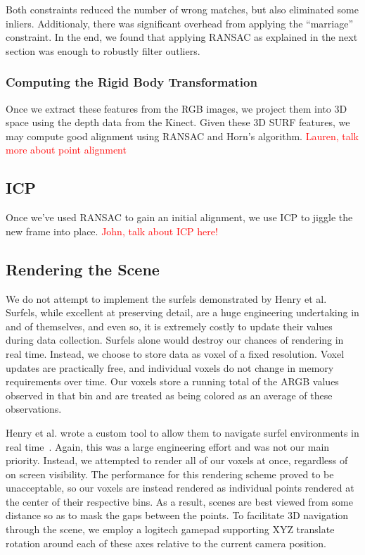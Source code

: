 \documentclass[letterpaper, 10pt, conference]{ieeeconf}
\newcommand{\xxx}[1]{\textcolor{red}{#1}}
\begin{document}
Both constraints reduced the number of wrong matches, but also eliminated some inliers.
Additionaly, there was significant overhead from applying the ``marriage'' constraint.
In the end, we found that applying RANSAC as explained in the next section was enough
to robustly filter outliers.

\subsubsection{Computing the Rigid Body Transformation}
\label{ransac}
Once we extract these features from the RGB images, we project them into 3D space
using the depth data from the Kinect. Given these 3D SURF features, we may
compute good alignment using RANSAC and Horn's algorithm. \xxx{Lauren, talk
    more about point alignment}

\subsection{ICP}
Once we've used RANSAC to gain an initial alignment, we use ICP to jiggle the
new frame into place. \xxx{John, talk about ICP here!}

\subsection{Rendering the Scene}
We do not attempt to implement the surfels demonstrated by Henry et al.
Surfels, while excellent at preserving detail, are a huge engineering
undertaking in and of themselves, and even so, it is extremely costly to
update their values during data collection. Surfels alone would destroy our
chances of rendering in real time. Instead, we choose to store data as voxel
of a fixed resolution. Voxel updates are practically free, and individual
voxels do not change in memory requirements over time. Our voxels store a
running total of the ARGB values observed in that bin and are treated as
being colored as an average of these observations.

Henry et al. wrote a custom tool to allow them to navigate surfel environments
in real time~\cite{Henry2010rgbd}. Again, this was a large engineering effort
and was not our main priority. Instead, we attempted to render all of our
voxels at once, regardless of on screen visibility. The performance for this
rendering scheme proved to be unacceptable, so our voxels are instead rendered
as individual points rendered at the center of their respective bins. As a
result, scenes are best viewed from some distance so as to mask the gaps
between the points. To facilitate 3D navigation through the scene, we employ a
logitech gamepad supporting XYZ translate rotation around each of these axes
relative to the current camera position.
\end{document}
